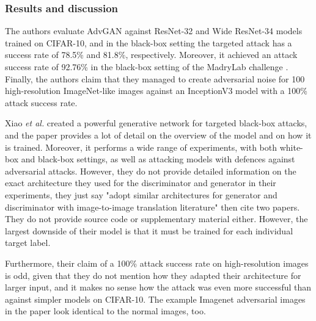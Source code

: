 \subsubsection{Results and discussion}

The authors evaluate AdvGAN against ResNet-32 and Wide ResNet-34 \cite{resnet} models trained on CIFAR-10, and in the black-box setting the targeted attack has a success rate of 78.5\% and 81.8\%, respectively. Moreover, it achieved an attack success rate of 92.76\% in the black-box setting of the MadryLab challenge \cite{madrylab}. Finally, the authors claim that they managed to create adversarial noise for 100 high-resolution ImageNet-like images against an InceptionV3 model \cite{inceptionv3} with a 100\% attack success rate.

Xiao \textit{et al.} created a powerful generative network for targeted black-box attacks, and the paper provides a lot of detail on the overview of the model and on how it is trained. Moreover, it performs a wide range of experiments, with both white-box and black-box settings, as well as attacking models with defences against adversarial attacks. However, they do not provide detailed information on the exact architecture they used for the discriminator and generator in their experiments, they just say "adopt similar architectures for generator and discriminator with image-to-image translation literature" then cite two papers. They do not provide source code or supplementary material either. However, the largest downside of their model is that it must be trained for each individual target label.

Furthermore, their claim of a 100\% attack success rate on high-resolution images is odd, given that they do not mention how they adapted their architecture for larger input, and it makes no sense how the attack was even more successful than against simpler models on CIFAR-10. The example Imagenet adversarial images in the paper look identical to the normal images, too.
